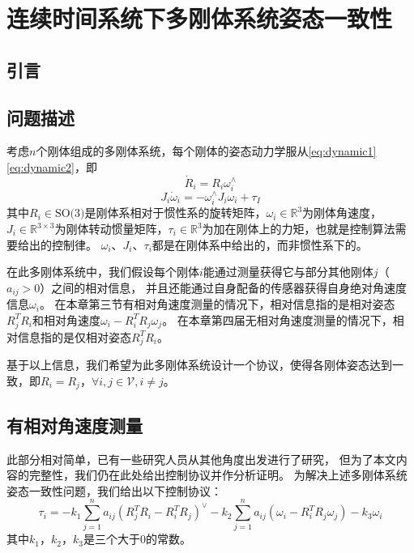 
\chapter{连续时间系统下多刚体系统姿态一致性}
\section{引言}
\section{问题描述}
考虑$n$个刚体组成的多刚体系统，每个刚体的姿态动力学服从\ref{eq:dynamic1}\ref{eq:dynamic2}，即
\begin{equation}
    \label{eq:dynamic3}
    \dot R_i=R_i\omega_i^\wedge
\end{equation}
\begin{equation}
    J_i\dot\omega_i=-\omega_i^\wedge J_i\omega_i+\tau_I
\end{equation}
其中$R_i\in\text{SO(3)}$是刚体系相对于惯性系的旋转矩阵，$\omega_i\in\mathbb{R}^3$为刚体角速度，
$J_i\in\mathbb{R}^{3\times 3}$为刚体转动惯量矩阵，$\tau_i\in\mathbb{R}^3$为加在刚体上的力矩，也就是控制算法需要给出的控制律。
$\omega_i$、$J_i$、$\tau_i$都是在刚体系中给出的，而非惯性系下的。

在此多刚体系统中，我们假设每个刚体$i$能通过测量获得它与部分其他刚体$j$（$a_{ij}>0$）之间的相对信息，
并且还能通过自身配备的传感器获得自身绝对角速度信息$\omega_i$。
在本章第三节有相对角速度测量的情况下，相对信息指的是相对姿态$R_j^TR_i$和相对角速度$\omega_i-R_i^TR_j\omega_j$。
在本章第四届无相对角速度测量的情况下，相对信息指的是仅相对姿态$R_j^TR_i$。

基于以上信息，我们希望为此多刚体系统设计一个协议，使得各刚体姿态达到一致，即$R_i=R_j$，$\forall i,j\in\mathcal{V},i\not=j$。

\section{有相对角速度测量}
此部分相对简单，已有一些研究人员从其他角度出发进行了研究\cite{maadani20226}\cite{sarlette2009autonomous}，
但为了本文内容的完整性，我们仍在此处给出控制协议并作分析证明。
为解决上述多刚体系统姿态一致性问题，我们给出以下控制协议：
\begin{equation}
    \label{eq:protocol1}
    \tau_i=-k_1\sum_{j=1}^na_{ij}(R_j^TR_i-R_i^TR_j)^{\vee}-k_2\sum_{j=1}^na_{ij}(\omega_i-R_i^TR_j\omega_j)-k_3\omega_i
\end{equation}
其中$k_1$，$k_2$，$k_3$是三个大于0的常数。

